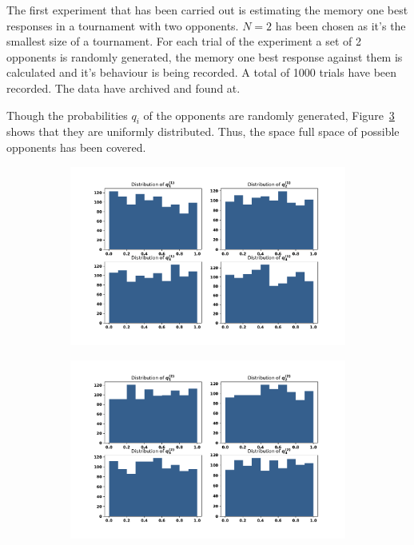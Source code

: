 \documentclass[10pt]{article}
\begin{document}
The first experiment that has been carried out is estimating the memory one
best responses in a tournament with two opponents. \(N=2\) has been chosen as it's
the smallest size of a tournament. For each trial of the experiment a set of
2 opponents is randomly generated, the memory one best response against them
is calculated and it's behaviour is being recorded. A total of 1000 trials have
been recorded. The data have archived and found at.

Though the probabilities \(q_i\) of the opponents are randomly generated,
Figure~\ref{fig:opponents_probabilities} shows that they are uniformly distributed.
Thus, the space full space of possible opponents has been covered.

\begin{figure}[!htbp]
    \begin{subfigure}{0.49\textwidth}
        \centering
        \includegraphics[width=\linewidth]{img/first_opponent_probabilities.pdf}
        \label{fig:opponents_probabilities}
    \end{subfigure}
    \begin{subfigure}{0.49\textwidth}
        \centering
        \includegraphics[width=\linewidth]{img/second_opponent_probabilities.pdf}
        \label{fig:opponents_probabilities}
    \end{subfigure}
\end{figure}
\end{document}
